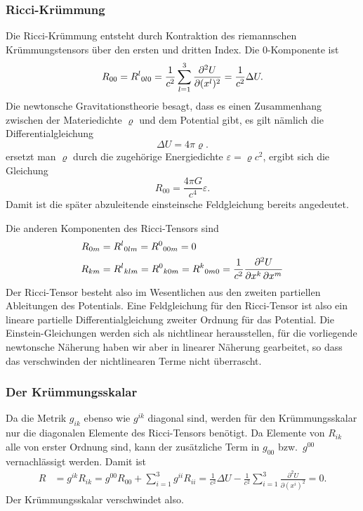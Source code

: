 \subsubsection{Ricci-Krümmung}
Die Ricci-Krümmung entsteht durch Kontraktion des riemannschen
Krümmungstensors über den ersten und dritten Index.
Die 0-Komponente ist
\[
R_{00}
=
R^l\mathstrut_{0l0}
=
\frac{1}{c^2}
\sum_{l=1}^3
\frac{\partial^2 U}{\partial (x^l)^2}
=
\frac{1}{c^2}\Delta U.
\]
Die newtonsche Gravitationstheorie besagt, dass es einen Zusammenhang
zwischen der Materiedichte $\varrho$ und dem Potential gibt, es gilt
nämlich die Differentialgleichung
\[
\Delta U = 4\pi \varrho.
\]
ersetzt man $\varrho$ durch die zugehörige Energiedichte
$\varepsilon = \varrho c^2$, ergibt sich die Gleichung
\[
R_{00}
=
\frac{4\pi G}{c^4}\varepsilon.
\]
Damit ist die später abzuleitende einsteinsche Feldgleichung bereits
angedeutet.

Die anderen Komponenten des Ricci-Tensors sind
\begin{align*}
R_{0m}
&=
R^l\mathstrut_{0lm}
=
R^0\mathstrut_{00m}
=
0
\\
R_{km}
&=
R^l\mathstrut_{klm}
=
R^0\mathstrut_{k0m}
=
R^k\mathstrut_{0m0}
=
\frac{1}{c^2}
\frac{\partial^2 U}{\partial x^k\,\partial x^m}
\end{align*}
Der Ricci-Tensor besteht also im Wesentlichen aus den zweiten
partiellen Ableitungen des Potentials.
Eine Feldgleichung für den Ricci-Tensor ist also ein lineare
partielle Differentialgleichung zweiter Ordnung für das Potential.
Die Einstein-Gleichungen werden sich als nichtlinear herausstellen,
für die vorliegende newtonsche Näherung haben wir aber in linearer
Näherung gearbeitet, so dass das verschwinden der nichtlinearen
Terme nicht überrascht.

\subsubsection{Der Krümmungsskalar}
Da die Metrik $g_{ik}$ ebenso wie $g^{ik}$ diagonal sind, werden
für den Krümmungsskalar nur die diagonalen Elemente des Ricci-Tensors
benötigt.
Da Elemente von $R_{ik}$ alle von erster Ordnung sind, kann der
zusätzliche Term in $g_{00}$ bzw.~$g^{00}$ vernachlässigt werden.
Damit ist 
\begin{align*}
R
&=
g^{ik}R_{ik}
=
g^{00}R_{00}
+
\sum_{i=1}^3
g^{ii}R_{ii}
=
\frac{1}{c^2}\Delta U
-
\frac{1}{c^2}
\sum_{i=1}^3
\frac{\partial^2 U}{\partial (x^i)^2}
=
0.
\end{align*}
Der Krümmungsskalar verschwindet also.

